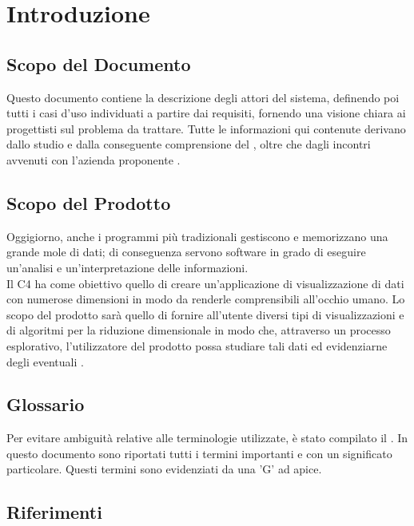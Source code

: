 \section{Introduzione}
\subsection{Scopo del Documento}
Questo documento contiene la descrizione degli attori del sistema, definendo poi tutti i casi d'uso individuati a partire dai requisiti, fornendo una visione chiara ai progettisti sul problema da trattare. Tutte le informazioni qui contenute derivano dallo studio e dalla conseguente comprensione del , oltre che dagli incontri avvenuti con l'azienda proponente \Proponente{}.
\subsection{Scopo del Prodotto}
Oggigiorno, anche i programmi più tradizionali gestiscono e memorizzano una grande mole di dati; di conseguenza servono software in grado di eseguire un'analisi e un'interpretazione delle informazioni.\\
Il  C4 ha come obiettivo quello di creare un'applicazione di visualizzazione di dati con numerose dimensioni in modo da renderle comprensibili all'occhio umano.  Lo scopo del prodotto sarà quello di fornire all'utente diversi tipi di visualizzazioni e di algoritmi per la riduzione dimensionale in modo che, attraverso un processo esplorativo, l'utilizzatore del prodotto possa studiare tali dati ed evidenziarne degli eventuali . 
\subsection{Glossario}
Per evitare ambiguità relative alle terminologie utilizzate, è stato compilato il . In questo documento sono riportati tutti i termini importanti e con un significato particolare. Questi termini sono evidenziati da una 'G' ad apice.
\subsection{Riferimenti}
